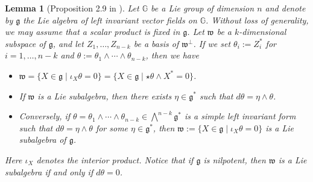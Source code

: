 \documentclass[dvipsnames]{amsart}
\newtheorem{lemma}[theorem]{Lemma}
\theoremstyle{definition}
\theoremstyle{definition}
\numberwithin{equation}{section}
\newcommand{\G}{\mathbb{G}}
\begin{document}
\begin{lemma}[Proposition 2.9 in \cite{FranchiSerapioni}]\label{lem: subalgebras}
Let $\G$ be a Lie group of dimension $n$ and denote by $\mathfrak{g}$ the Lie algebra of left invariant vector fields on $\G$. Without loss of generality, we may assume that a scalar product is fixed in $\mathfrak{g}$. Let $\mathfrak{w}$ be a {$k$-dimensional subspace of $\mathfrak{g}$}, and let $Z_1,\ldots,Z_{n-k}$ be a basis of $\mathfrak{w}^\perp$. If we set $\theta_i:=Z_i^\ast$ for $i=1,\ldots,n-k$ and $\theta:=\theta_1\wedge\cdots\wedge\theta_{n-k}$, then we have
    \begin{itemize}
        \item [i.] $\mathfrak{w}=\{X\in\mathfrak{g}\mid \iota_X\theta=0\}=\{X\in\mathfrak{g}\mid \star\theta\wedge X^\ast=0\}$.
        \item[ii.] {If $\mathfrak w$ is a Lie subalgebra, then there} exists $\eta\in\mathfrak{g}^\ast$ such that $d\theta=\eta\wedge\theta$.
        \item[iii.]
        {Conversely,} if $\theta=\theta_1\wedge\cdots\wedge\theta_{n-k}\in\bigwedge^{n-k}\mathfrak{g}^\ast$ is a simple left invariant form such that $d\theta=\eta\wedge\theta$ for some $\eta\in\mathfrak{g}^\ast$, then
        $\mathfrak{w}:=\{X\in\mathfrak{g}\mid \iota_X\theta=0\}$ is a Lie subalgebra of $\mathfrak{g}$.
    \end{itemize}
    Here $\iota_X$ denotes the interior product. Notice that  if $\mathfrak g$ is nilpotent, then $\mathfrak w$ is a Lie subalgebra if and only if $d\theta=0$. 
\end{lemma}

\end{document}
